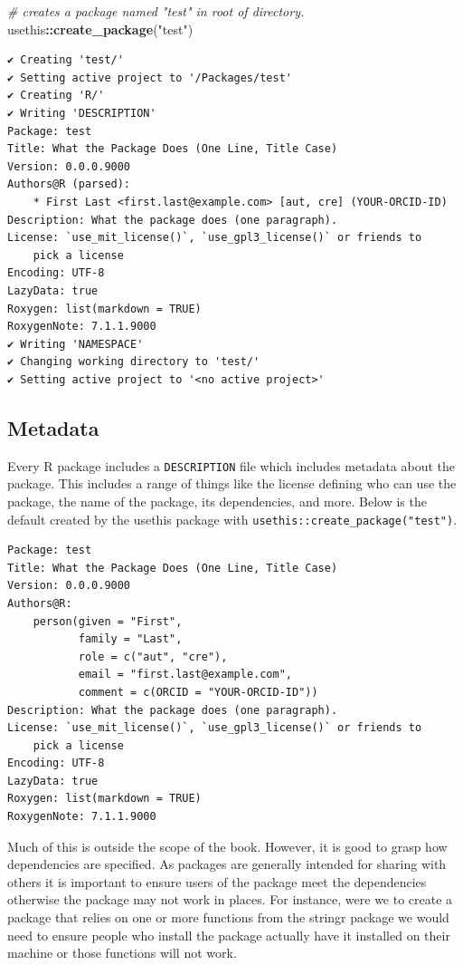 \documentclass[
]{krantz}
\makeatletter
\newenvironment{Shaded}{\begin{snugshade}}{\end{snugshade}}
\newcommand{\CommentTok}[1]{\textcolor[rgb]{0.37,0.37,0.37}{\textit{#1}}}
\newcommand{\KeywordTok}[1]{\textcolor[rgb]{0.27,0.27,0.27}{\textbf{#1}}}
\newcommand{\NormalTok}[1]{#1}
\newcommand{\OperatorTok}[1]{\textcolor[rgb]{0.43,0.43,0.43}{\textbf{#1}}}
\newcommand{\StringTok}[1]{\textcolor[rgb]{0.5,0.5,0.5}{#1}}
\newenvironment{kframe}{%
\medskip{}
\setlength{\fboxsep}{.8em}
 \def\at@end@of@kframe{}%
 \ifinner\ifhmode%
  \def\at@end@of@kframe{\end{minipage}}%
  \begin{minipage}{\columnwidth}%
 \fi\fi%
 \def\FrameCommand##1{\hskip\@totalleftmargin \hskip-\fboxsep
 \colorbox{shadecolor}{##1}\hskip-\fboxsep
     \hskip-\linewidth \hskip-\@totalleftmargin \hskip\columnwidth}%
 \MakeFramed {\advance\hsize-\width
   \@totalleftmargin\z@ \linewidth\hsize
   \@setminipage}}%
 {\par\unskip\endMakeFramed%
 \at@end@of@kframe}
\renewenvironment{Shaded}{\begin{kframe}}{\end{kframe}}
\makeatother
\begin{document}
\begin{Shaded}
\begin{Highlighting}[]
\CommentTok{\# creates a package named "test" in root of directory.}
\NormalTok{usethis}\OperatorTok{::}\KeywordTok{create\_package}\NormalTok{(}\StringTok{"test"}\NormalTok{)}
\end{Highlighting}
\end{Shaded}

\begin{verbatim}
✔ Creating 'test/'
✔ Setting active project to '/Packages/test'
✔ Creating 'R/'
✔ Writing 'DESCRIPTION'
Package: test
Title: What the Package Does (One Line, Title Case)
Version: 0.0.0.9000
Authors@R (parsed):
    * First Last <first.last@example.com> [aut, cre] (YOUR-ORCID-ID)
Description: What the package does (one paragraph).
License: `use_mit_license()`, `use_gpl3_license()` or friends to
    pick a license
Encoding: UTF-8
LazyData: true
Roxygen: list(markdown = TRUE)
RoxygenNote: 7.1.1.9000
✔ Writing 'NAMESPACE'
✔ Changing working directory to 'test/'
✔ Setting active project to '<no active project>'
\end{verbatim}

\hypertarget{basics-metadata}{%
\subsection{Metadata}\label{basics-metadata}}

Every R package includes a \texttt{DESCRIPTION} file which includes metadata about the package. This includes a range of things like the license defining who can use the package, the name of the package, its dependencies, and more. Below is the default created by the usethis package with \texttt{usethis::create\_package("test")}.

\begin{verbatim}
Package: test
Title: What the Package Does (One Line, Title Case)
Version: 0.0.0.9000
Authors@R: 
    person(given = "First",
           family = "Last",
           role = c("aut", "cre"),
           email = "first.last@example.com",
           comment = c(ORCID = "YOUR-ORCID-ID"))
Description: What the package does (one paragraph).
License: `use_mit_license()`, `use_gpl3_license()` or friends to
    pick a license
Encoding: UTF-8
LazyData: true
Roxygen: list(markdown = TRUE)
RoxygenNote: 7.1.1.9000
\end{verbatim}

Much of this is outside the scope of the book. However, it is good to grasp how dependencies are specified. As packages are generally intended for sharing with others it is important to ensure users of the package meet the dependencies otherwise the package may not work in places. For instance, were we to create a package that relies on one or more functions from the stringr \citep{R-stringr} package we would need to ensure people who install the package actually have it installed on their machine or those functions will not work.
\end{document}
